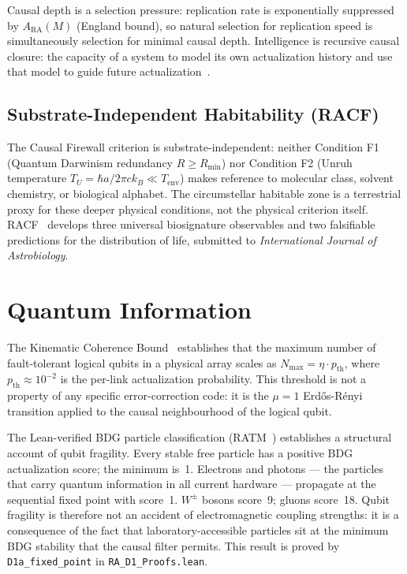 \documentclass[11pt,a4paper]{article}
\begin{document}
Causal depth is a selection pressure: replication rate is exponentially
suppressed by $A_{\mathrm{RA}}(M)$ (England bound), so natural selection
for replication speed is simultaneously selection for minimal causal depth.
Intelligence is recursive causal closure: the capacity of a system to
model its own actualization history and use that model to guide future
actualization~\citep{Sandeman2026RAHC}.

\subsection{Substrate-Independent Habitability (RACF)}

The Causal Firewall criterion is substrate-independent: neither Condition
F1 (Quantum Darwinism redundancy $R \geq R_{\min}$) nor Condition F2
(Unruh temperature $T_U = \hbar a/2\pi c k_B \ll T_{\mathrm{env}}$) makes
reference to molecular class, solvent chemistry, or biological alphabet.
The circumstellar habitable zone is a terrestrial proxy for these deeper
physical conditions, not the physical criterion itself.
RACF~\citep{Sandeman2026RACF} develops three universal biosignature
observables and two falsifiable predictions for the distribution of life,
submitted to \emph{International Journal of Astrobiology}.

\section{Quantum Information}
\label{sec:QI}

The Kinematic Coherence Bound~\citep{Sandeman2026RAQI} establishes
that the maximum number of fault-tolerant logical qubits in a physical
array scales as $N_{\max} = \eta \cdot p_{\mathrm{th}}$, where
$p_{\mathrm{th}} \approx 10^{-2}$ is the per-link actualization
probability. This threshold is not a property of any specific
error-correction code: it is the $\mu = 1$ Erd\H{o}s-R\'{e}nyi
transition applied to the causal neighbourhood of the logical qubit.

The Lean-verified BDG particle classification (RATM~\citep{Sandeman2026RATM})
establishes a structural account of qubit fragility. Every stable free
particle has a positive BDG actualization score; the minimum is~1.
Electrons and photons --- the particles that carry quantum information
in all current hardware --- propagate at the sequential fixed point
with score~1. $W^\pm$ bosons score~9; gluons score~18. Qubit fragility
is therefore not an accident of electromagnetic coupling strengths: it
is a consequence of the fact that laboratory-accessible particles sit at
the minimum BDG stability that the causal filter permits. This result is
proved by \texttt{D1a\_fixed\_point} in \texttt{RA\_D1\_Proofs.lean}.
\end{document}
